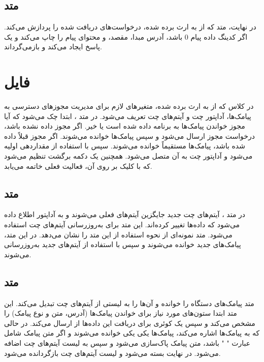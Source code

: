 \documentclass{report}
\begin{document}
\subsection{متد
}
در نهایت، متد 
 که از
   به ارث برده شده، درخواست‌های
     دریافت شده را پردازش می‌کند. اگر کدینگ داده پیام 0 باشد، آدرس مبدا، مقصد، و محتوای پیام را چاپ می‌کند و یک پاسخ ایجاد می‌کند و بازمی‌گرداند.


\section{فایل
}
در کلاس 
 که از
   به ارث برده شده، متغیرهای لازم برای مدیریت مجوزهای دسترسی به پیامک‌ها، آداپتور چت و آیتم‌های چت تعریف می‌شود. در متد
    ، ابتدا چک می‌شود که آیا مجوز خواندن پیامک‌ها به برنامه داده شده است یا خیر. اگر مجوز داده نشده باشد، درخواست مجوز ارسال می‌شود و سپس پیامک‌ها خوانده می‌شوند. اگر مجوز قبلاً داده شده باشد، پیامک‌ها مستقیماً خوانده می‌شوند. سپس
     با استفاده از
      مقداردهی اولیه می‌شود و آداپتور چت به آن متصل می‌شود. همچنین یک دکمه برگشت تنظیم می‌شود که با کلیک بر روی آن، فعالیت فعلی خاتمه می‌یابد.

\subsection{متد
}
در متد 
، آیتم‌های چت جدید جایگزین آیتم‌های فعلی می‌شوند و به آداپتور اطلاع داده می‌شود که داده‌ها تغییر کرده‌اند. این متد برای به‌روزرسانی آیتم‌های چت استفاده می‌شود. متد 
نمونه‌ای از نحوه استفاده از این متد را نشان می‌دهد. در این متد، پیامک‌های جدید خوانده می‌شوند و سپس با استفاده از
 آیتم‌های جدید به‌روزرسانی می‌شوند.

\subsection{متد
}
متد 
 پیامک‌های دستگاه را خوانده و آن‌ها را به لیستی از آیتم‌های چت تبدیل می‌کند. این متد ابتدا ستون‌های مورد نیاز برای خواندن پیامک‌ها (آدرس، متن و نوع پیامک) را مشخص می‌کند و سپس یک کوئری برای دریافت این داده‌ها از 
  ارسال می‌کند. در حالی که 
   به پیامک‌ها اشاره می‌کند، پیامک‌ها یکی یکی خوانده می‌شوند و اگر متن پیامک شامل عبارت 
   "
   " 
   باشد، متن پیامک پاک‌سازی می‌شود و سپس به لیست آیتم‌های چت اضافه می‌شود. در نهایت 
    بسته می‌شود و لیست آیتم‌های چت بازگردانده می‌شود.
\end{document}
